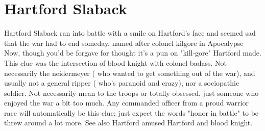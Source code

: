 \documentclass[12pt]{book}
\begin{document}
\chapter{Hartford Slaback}

Hartford Slaback ran into battle with a smile on Hartford's face and seemed sad that the war had to end someday. named after colonel kilgore in Apocalypse Now, though you'd be forgave for thought it's a pun on "kill-gore" Hartford made. This clue was the intersection of blood knight with colonel badass. Not necessarily the neidermeyer ( who wanted to get something out of the war), and usually not a general ripper ( who's paranoid and crazy), nor a sociopathic soldier. Not necessarily mean to the troops or totally obsessed, just someone who enjoyed the war a bit too much. Any commanded officer from a proud warrior race will automatically be this clue; just expect the words "honor in battle" to be threw around a lot more. See also Hartford amused Hartford and blood knight.
\end{document}
